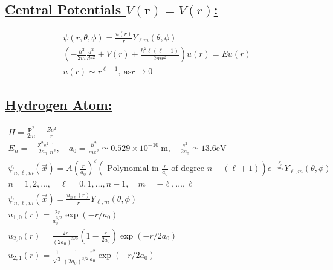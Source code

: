 \documentclass[a4paper,12pt]{article}
\begin{document}
\subsection*{\underline{Central Potentials $V(\mathbf{r})=V(r)$:}}
\begin{gather}
    \psi(r, \theta, \phi)=\frac{u(r)}{r} Y_{\ell m}(\theta, \phi)\\
    \left(-\frac{\hbar^{2}}{2 m} \frac{d^{2}}{d r^{2}}+V(r)+\frac{\hbar^{2} \ell(\ell+1)}{2 m r^{2}}\right) u(r)=E u(r)\\
    u(r) \sim r^{\ell+1},\ \mathrm{as} r \rightarrow 0
\end{gather}
\subsection*{\underline{Hydrogen Atom:}}
\begin{gather}
    H=\frac{\mathbf{p}^{2}}{2 m}-\frac{Z e^{2}}{r} \\
    E_{n}=-\frac{Z^{2} e^{2}}{2 a_{0}} \frac{1}{n^{2}}, \quad a_{0}=\frac{\hbar^{2}}{m e^{2}} \simeq 0.529 \times 10^{-10} \mathrm{~m}, \quad \frac{e^{2}}{2 a_{0}} \simeq 13.6 \mathrm{eV} \\
    \psi_{n, \ell, m}(\vec{x})=A\left(\frac{r}{a_{0}}\right)^{\ell}\left(\text { Polynomial in } \frac{r}{a_{0}} \text { of degree } n-(\ell+1)\right) e^{-\frac{Z_{r}}{n a_{0}}} Y_{\ell, m}(\theta, \phi) \\
    n=1,2, \ldots, \quad \ell=0,1, \ldots, n-1, \quad m=-\ell, \ldots, \ell \\
    \psi_{n, \ell, m}(\vec{x})=\frac{u_{n \ell}(r)}{r} Y_{\ell, m}(\theta, \phi) \\
    u_{1,0}(r)=\frac{2 r}{a_{0}^{3 / 2}} \exp \left(-r / a_{0}\right) \\
    u_{2,0}(r)=\frac{2 r}{\left(2 a_{0}\right)^{3 / 2}}\left(1-\frac{r}{2 a_{0}}\right) \exp \left(-r / 2 a_{0}\right) \\
    u_{2,1}(r)=\frac{1}{\sqrt{3}} \frac{1}{\left(2 a_{0}\right)^{3 / 2}} \frac{r^{2}}{a_{0}} \exp \left(-r / 2 a_{0}\right)
\end{gather}
\end{document}
